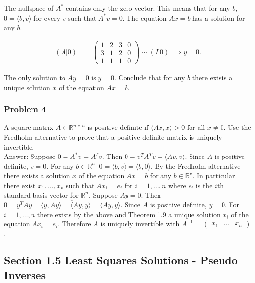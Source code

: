 \documentclass{article}
\begin{document}
\begin{enumerate}[a.]
The nullspace of $A^*$ contains only the zero vector. This means that for any $b$, $0 = \langle b, v\rangle$ for every $v$ such that $A^*v = 0$. The equation $Ax = b$ has a solution for any $b$. 

\begin{align*}
(A \vert 0) &= 
\begin{pmatrix}
1 & 2 & 3  & 0\\ 3 & 1 & 2 & 0 \\ 1 & 1 & 1 & 0
\end{pmatrix} \sim (I | 0) \implies y = 0.
\end{align*}

The only solution to $Ay = 0$ is $y = 0$. Conclude that for any $b$ there exists a unique solution $x$ of the equation $Ax = b$. 

\end{enumerate}

\subsubsection*{Problem 4}

A square matrix $A \in \mathbb{R}^{n\times n}$ is positive definite if $\langle Ax , x \rangle > 0$ for all $x \neq 0$. Use the Fredholm alternative to prove that a positive definite matrix is uniquely invertible. \\

Answer: Suppose $0 = A^*v = A^Tv$. Then $0 = v^TA^Tv = \langle Av, v \rangle$. Since $A$ is positive definite, $v = 0$. For any $b \in \mathbb{R}^n$, $0 = \langle b , v \rangle = \langle b , 0 \rangle$. By the Fredholm alternative there exists a solution $x$ of the equation $Ax = b$ for any $b \in \mathbb{R}^n$. In particular there exist $x_1, \dots , x_n$ such that $Ax_i = e_i$ for $i = 1,\dots , n$ where $e_i$ is the $i$th standard basis vector for $\mathbb{R}^n$. Suppose $Ay = 0$. Then $0 = y^T Ay = \langle y , Ay \rangle = \overline \langle Ay , y \rangle = \langle Ay , y \rangle$. Since $A$ is positive definite, $y = 0$. For $i = 1, \dots , n$ there exists by the above and Theorem 1.9 a unique solution $x_i$ of the equation $Ax_i = e_i$. Therefore $A$ is uniquely invertible with $A^{-1} = \begin{pmatrix} x_1 & \dots & x_n\end{pmatrix}$. 


\newpage
\subsection*{Section 1.5 Least Squares Solutions - Pseudo Inverses}
\end{document}

